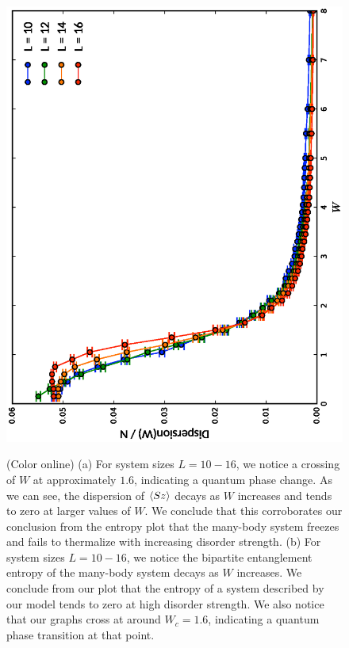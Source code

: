 \documentclass[prl,aps,epsf,showpacs,twocolumn,letterpaper]{revtex4}
\begin{document}
\begin{figure}
  \includegraphics[angle=-90,width=0.9\linewidth]{dispersion_plot.ps} \\
  \caption{(Color online) (a) For system sizes $L = 10-16$, we notice a crossing
    of $W$ at approximately $1.6$, indicating a quantum phase change.
    As we can see, the dispersion of $\braket{Sz}$ decays as $W$ increases and
    tends to zero at larger values of $W$.
    We conclude that this corroborates our conclusion from the entropy plot that
    the many-body system freezes and fails to thermalize with increasing
    disorder strength.
    (b) For system sizes $L = 10-16$, we notice the bipartite entanglement
    entropy of the many-body system decays as $W$ increases.
    We conclude from our plot that the entropy of a system described by our
    model tends to zero at high disorder strength.
    We also notice that our graphs cross at around $W_c=1.6$, indicating a
    quantum phase transition at that point.
  }
\label{fig1}
\end{figure}
\end{document}
